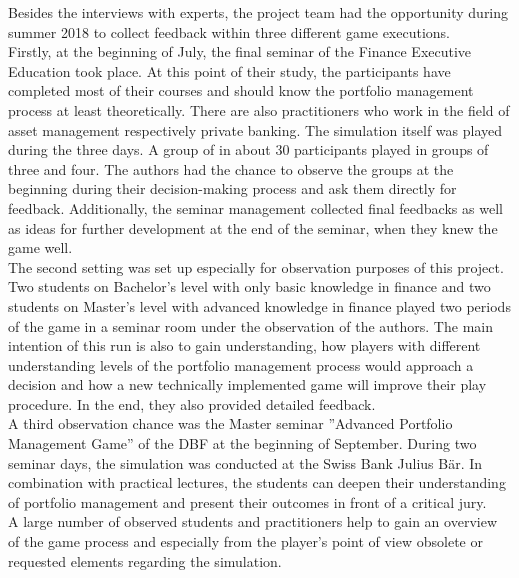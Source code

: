 Besides the interviews with experts, the project team had the opportunity during summer 2018 to collect feedback within three different game executions. \\

Firstly, at the beginning of July, the final seminar of the Finance Executive Education took place. At this point of their study, the participants have completed most of their courses and should know the portfolio management process at least theoretically. There are also practitioners who work in the field of asset management respectively private banking. The simulation itself was played during the three days. A group of in about 30 participants played in groups of three and four. The authors had the chance to observe the groups at the beginning during their decision-making process and ask them directly for feedback. Additionally, the seminar management collected final feedbacks as well as ideas for further development at the end of the seminar, when they knew the game well. \\

The second setting was set up especially for observation purposes of this project. Two students on Bachelor’s level with only basic knowledge in finance and two students on Master’s level with advanced knowledge in finance played two periods of the game in a seminar room under the observation of the authors. The main intention of this run is also to gain understanding, how players with different understanding levels of the portfolio management process would approach a decision and how a new technically implemented game will improve their play procedure. In the end, they also provided detailed feedback. \\

A third observation chance was the Master seminar ''Advanced Portfolio Management Game'' of the DBF at the beginning of September. During two seminar days, the simulation was conducted at the Swiss Bank Julius Bär. In combination with practical lectures, the students can deepen their understanding of portfolio management and present their outcomes in front of a critical jury. \\

A large number of observed students and practitioners help to gain an overview of the game process and especially from the player’s point of view obsolete or requested elements regarding the simulation. \\



